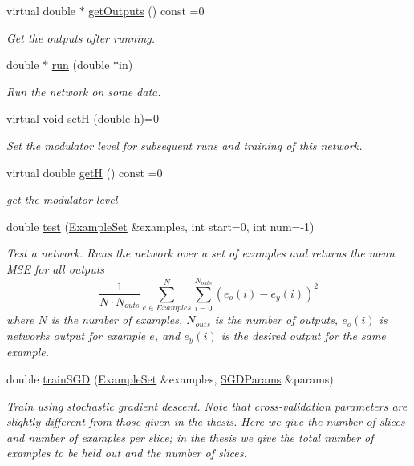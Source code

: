 \begin{DoxyCompactItemize}
virtual double $\ast$ \hyperlink{classNet_a38d901e18a4a269ca7ed3766cc4b4079}{get\+Outputs} () const =0
\begin{DoxyCompactList}\small\item\em Get the outputs after running. \end{DoxyCompactList}\item 
double $\ast$ \hyperlink{classNet_a3f711482dd39b9653f4449304b853a79}{run} (double $\ast$in)
\begin{DoxyCompactList}\small\item\em Run the network on some data. \end{DoxyCompactList}\item 
virtual void \hyperlink{classNet_a5a01870e21e29845252d6bec88b0c497}{setH} (double h)=0
\begin{DoxyCompactList}\small\item\em Set the modulator level for subsequent runs and training of this network. \end{DoxyCompactList}\item 
virtual double \hyperlink{classNet_afc3db6d4a7b1307b359f98da0b9b3bf2}{getH} () const =0
\begin{DoxyCompactList}\small\item\em get the modulator level \end{DoxyCompactList}\item 
double \hyperlink{classNet_a5b4d9d5fcf5b31d2ae163cbe3f5b151f}{test} (\hyperlink{classExampleSet}{Example\+Set} \&examples, int start=0, int num=-\/1)
\begin{DoxyCompactList}\small\item\em Test a network. Runs the network over a set of examples and returns the mean M\+SE for all outputs \[ \frac{1}{N\cdot N_{outs}}\sum^N_{e \in Examples} \sum_{i=0}^{N_{outs}} (e_o(i) - e_y(i))^2 \] where $N$ is the number of examples, $N_{outs}$ is the number of outputs, $e_o(i)$ is network\textquotesingle{}s output for example $e$, and $e_y(i)$ is the desired output for the same example. \end{DoxyCompactList}\item 
double \hyperlink{classNet_a4e527a7773eed5fb071b78ef3a636c95}{train\+S\+GD} (\hyperlink{classExampleSet}{Example\+Set} \&examples, \hyperlink{structNet_1_1SGDParams}{S\+G\+D\+Params} \&params)
\begin{DoxyCompactList}\small\item\em Train using stochastic gradient descent. Note that cross-\/validation parameters are slightly different from those given in the thesis. Here we give the number of slices and number of examples per slice; in the thesis we give the total number of examples to be held out and the number of slices. \end{DoxyCompactList}\item 

\end{DoxyCompactItemize}

